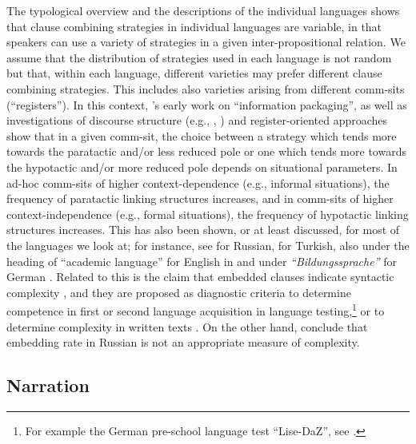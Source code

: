 \documentclass[output=paper,colorlinks,citecolor=brown]{langscibook}
\begin{document}
The typological overview and the descriptions of the individual languages shows that clause combining strategies in individual languages are variable, in that speakers can use a variety of strategies in a given inter-propositional relation. We assume that the distribution of strategies used in each language is not random but that, within each language, different varieties may prefer different clause combining strategies. This includes also varieties arising from different comm-sits (“registers”). In this context, \textcite{chafe1976givenness}’s early work on “information packaging”, as well as investigations of discourse structure (e.g., \citeauthor{miller1998spontaneous}, \citeyear{miller1998spontaneous}) and register-oriented approaches \parencite{biber2011should,biber2019register}  show that in a given comm-sit, the choice between a strategy which tends more towards the paratactic and/or less reduced pole or one which tends more towards the hypotactic and/or more reduced pole depends on situational parameters. In ad-hoc comm-sits of higher context-dependence (e.g., informal situations), the frequency of paratactic linking structures increases, and in comm-sits of higher context-independence (e.g., formal situations), the frequency of hypotactic linking structures increases. This has also been shown, or at least discussed, for most of the languages we look at; for instance, see \textcite{kozina2011stilistika}  for Russian, \textcite{schroeder2002structure,schroeder2016clause} for Turkish, also under the heading of “academic language” for English in \textcite{schleppegrell2004language}  and under \textit{“Bildungssprache”} for German \parencite{gogolin2006bilingualitat,gogolin2013mehrsprachigkeit,haberzettl2016bildungssprache}. Related to this is the claim that embedded clauses indicate syntactic complexity \parencite{sanchez2017syntactic,housen2019multiple}, and they are proposed as diagnostic criteria to determine competence in first or second language acquisition in language testing,\footnote{For example the German pre-school language test “Lise-DaZ”, see \textcite{schulz2011}.}  or to determine complexity in written texts \parencite{biber2011should}. On the other hand, \textcite{martynova2024use} conclude that embedding rate in Russian is not an appropriate measure of complexity.

\subsection{Narration} \label{sec:schroederetal:1.4}
\end{document}
